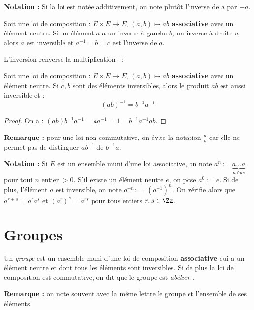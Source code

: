 \documentclass[class=report,crop=false]{standalone}
\begin{document}
{\bf Notation :} Si la loi est notée additivement, on note plutôt l'inverse de $a$ par $-a$.
\begin{exercicecours}
Soit une loi de composition : $E \times E \to E$, $(a,b) \mapsto ab$ {\bf associative} avec un élément neutre. Si un élément $a$ a un inverse à gauche $b$, un inverse à droite $c$, alors $a$ est inversible et $a^{-1}=b=c$ est l'inverse de $a$.
\end{exercicecours}

\og L'inversion renverse la multiplication \fg\ :

\begin{proposition}
Soit une loi de composition : $E \times E \to E$, $(a,b) \mapsto ab$ {\bf associative} avec un élément neutre. Si $a,b$ sont des éléments inversibles, alors le produit $ab$ est aussi inversible et :
\[(ab)^{-1} = b^{-1} a^{-1}\]
\end{proposition}

\begin{proof}
On a : $(ab)b^{-1} a^{-1} =aa^{-1} =1 = b^{-1} a^{-1} ab$.
\end{proof}

{\bf Remarque :} pour une loi non commutative, on évite la notation $\frac{a}{b}$ car elle ne permet pas de distinguer $ab^{-1}$ de $b^{-1} a$.


{\bf Notation :} Si $E$ est un ensemble muni d'une loi associative, on note $a^n:= \underbrace{a...a}_{n\;\mathrm fois}$ pour tout $n $ entier $>0$. S'il existe un élément neutre $e$, on pose $a^0:=e$. Si de plus, l'élément $a$ est inversible, on note $a^{-n} : = (a^{-1})^n$. On vérifie alors que $a^{r+s}=a^ra^s$ et $(a^r)^s = a^{rs}$ pour tous entiers $r,s \in \Zz$.

\section{Groupes}

\begin{definition}
Un {\it groupe}  est un ensemble  muni d'une loi de composition {\bf associative} qui a un élément neutre et dont tous les éléments sont  inversibles. Si de plus la loi de composition est commutative, on dit que le groupe est {\it abélien} .
\end{definition}

{\bf Remarque :} on note souvent avec la même lettre le groupe et l'ensemble de ses éléments.
\end{document}
